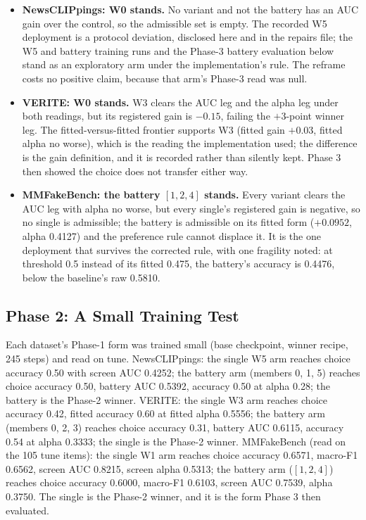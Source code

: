 \documentclass{article} %
\begin{document}
\begin{itemize}
    \item \textbf{NewsCLIPpings: W0 stands.} No variant and not the battery has an AUC gain over the control, so the admissible set is empty. The recorded W5 deployment is a protocol deviation, disclosed here and in the repairs file; the W5 and battery training runs and the Phase-3 battery evaluation below stand as an exploratory arm under the implementation's rule. The reframe costs no positive claim, because that arm's Phase-3 read was null.
    \item \textbf{VERITE: W0 stands.} W3 clears the AUC leg and the alpha leg under both readings, but its registered gain is \(-0.15\), failing the \(+3\)-point winner leg. The fitted-versus-fitted frontier supports W3 (fitted gain \(+0.03\), fitted alpha no worse), which is the reading the implementation used; the difference is the gain definition, and it is recorded rather than silently kept. Phase 3 then showed the choice does not transfer either way.
    \item \textbf{MMFakeBench: the battery \([1, 2, 4]\) stands.} Every variant clears the AUC leg with alpha no worse, but every single's registered gain is negative, so no single is admissible; the battery is admissible on its fitted form (\(+0.0952\), alpha 0.4127) and the preference rule cannot displace it. It is the one deployment that survives the corrected rule, with one fragility noted: at threshold 0.5 instead of its fitted 0.475, the battery's accuracy is 0.4476, below the baseline's raw 0.5810.
\end{itemize}

\subsection{Phase 2: A Small Training Test}
Each dataset's Phase-1 form was trained small (base checkpoint, winner recipe, 245 steps) and read on tune. NewsCLIPpings: the single W5 arm reaches choice accuracy 0.50 with screen AUC 0.4252; the battery arm (members 0, 1, 5) reaches choice accuracy 0.50, battery AUC 0.5392, accuracy 0.50 at alpha 0.28; the battery is the Phase-2 winner. VERITE: the single W3 arm reaches choice accuracy 0.42, fitted accuracy 0.60 at fitted alpha 0.5556; the battery arm (members 0, 2, 3) reaches choice accuracy 0.31, battery AUC 0.6115, accuracy 0.54 at alpha 0.3333; the single is the Phase-2 winner. MMFakeBench (read on the 105 tune items): the single W1 arm reaches choice accuracy 0.6571, macro-F1 0.6562, screen AUC 0.8215, screen alpha 0.5313; the battery arm (\([1, 2, 4]\)) reaches choice accuracy 0.6000, macro-F1 0.6103, screen AUC 0.7539, alpha 0.3750. The single is the Phase-2 winner, and it is the form Phase 3 then evaluated.
\end{document}
